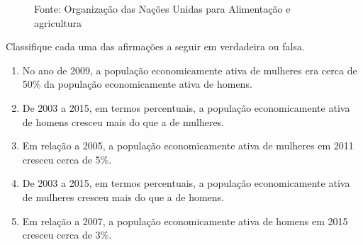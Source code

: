 {\begin{figure}[H]
\caption{Fonte: Organização das Nações Unidas para Alimentação e agricultura}\label{\detokenize{PE103-E:fig-coloque-aqui-o-nome}}\label{\detokenize{PE103-E:id18}}\end{figure}

Classifique cada uma das afirmações a seguir em verdadeira ou falsa.
\begin{enumerate}
\item {} 
No ano de 2009, a população economicamente ativa de mulheres era cerca de 50\% da população economicamente ativa de homens.

\item {} 
De 2003 a 2015, em termos percentuais, a população economicamente ativa de homens cresceu mais do que a de mulheres.

\item {} 
Em relação a 2005, a população economicamente ativa de mulheres em 2011 cresceu cerca de 5\%.

\item {} 
De 2003 a 2015, em termos percentuais, a população economicamente ativa de mulheres cresceu mais do que a de homens.

\item {} 
Em relação a 2007, a população economicamente ativa de homens em 2015 cresceu cerca de 3\%.

\end{enumerate}

}
